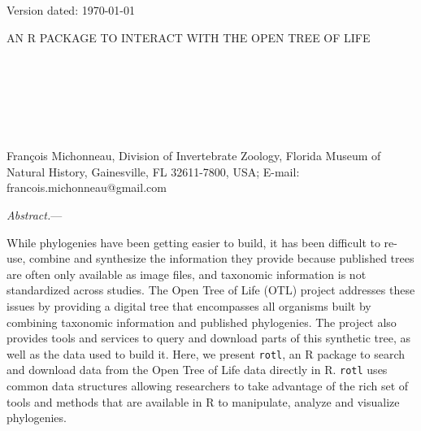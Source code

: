 \documentclass[12pt,letterpaper]{article}\usepackage[]{graphicx}\usepackage[]{color}
\renewcommand{\subsubsection}[1]{%
\vspace{2ex}
\noindent
\textit{#1.}---}
\begin{document}
\begin{flushright}
Version dated: \today
\end{flushright}

\bigskip
\noindent AN R PACKAGE TO INTERACT WITH THE OPEN TREE OF LIFE

\bigskip
\medskip

\begin{center}

\bigskip

\\

\\
 \\
 \\
 \\
\end{center}
\medskip

 Fran\c{c}ois Michonneau, Division of
Invertebrate Zoology, Florida Museum of Natural History, Gainesville, FL
32611-7800, USA; E-mail: francois.michonneau@gmail.com\\


\vspace{1in}

\subsubsection{Abstract}

While phylogenies have been getting easier to build, it has been difficult to
re-use, combine and synthesize the information they provide because published
trees are often only available as image files, and taxonomic information is not
standardized across studies. The Open Tree of Life (OTL) project addresses these
issues by providing a digital tree that encompasses all organisms built by
combining taxonomic information and published phylogenies. The project also
provides tools and services to query and download parts of this synthetic tree,
as well as the data used to build it. Here, we present \texttt{rotl}, an R
package to search and download data from the Open Tree of Life data directly in
R. \texttt{rotl} uses common data structures allowing researchers to take
advantage of the rich set of tools and methods that are available in R to
manipulate, analyze and visualize phylogenies.
\end{document}
